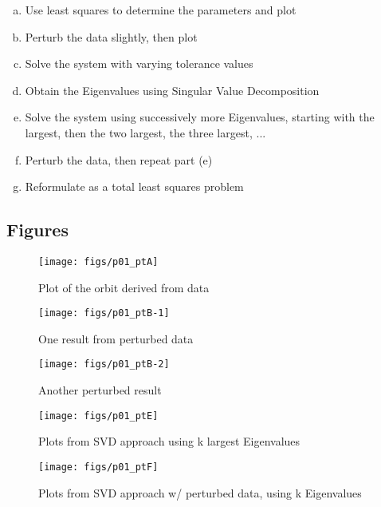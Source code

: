 \documentclass[paper=a4, fontsize=11pt]{scrartcl}
\numberwithin{equation}{section}		%
\numberwithin{figure}{section}			%
\numberwithin{table}{section}				%
\begin{document}
\begin{enumerate}[(a)]
	\item Use least squares to determine the parameters and plot  \vspace{-2mm}
	\item Perturb the data slightly, then plot \vspace{-2mm}
	\item Solve the system with varying tolerance values \vspace{-2mm}
	\item Obtain the Eigenvalues using Singular Value Decomposition \vspace{-2mm}
	\item Solve the system using successively more Eigenvalues, starting with the largest, then the two largest, the three largest, ... \vspace{-2mm}
	\item Perturb the data, then repeat part (e) \vspace{-2mm}
	\item Reformulate as a total least squares problem \vspace{-2mm}
\end{enumerate}

\vspace{4mm}
\subsection{Figures}

\begin{figure}[!hbt]
		\texttt{[image: figs/p01\_ptA]}
		\caption{Plot of the orbit derived from data}
		\label{fig:3.5-a}
	\endminipage\hfill
		\texttt{[image: figs/p01\_ptB-1]}
		\caption{One result from perturbed data}
		\label{fig:p3.5-b1}
	\endminipage\hfill
		\texttt{[image: figs/p01\_ptB-2]}
		\caption{Another perturbed result}
		\label{fig:p3.5-b2}
	\endminipage\hfill
\end{figure}
\begin{figure}[!hbt]
		\texttt{[image: figs/p01\_ptE]}
		\caption{Plots from SVD approach using k largest Eigenvalues}
		\label{fig:3.5-e}
	\endminipage\hfill
		\texttt{[image: figs/p01\_ptF]}
		\caption{Plots from SVD approach w/ perturbed data, using k Eigenvalues}
		\label{fig:3.5-f}
	\endminipage\hfill
\end{figure}
\end{document}

